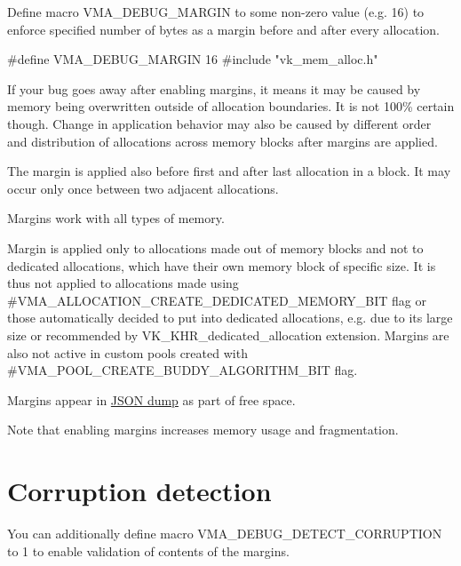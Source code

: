 Define macro {\ttfamily V\+M\+A\+\_\+\+D\+E\+B\+U\+G\+\_\+\+M\+A\+R\+G\+IN} to some non-\/zero value (e.\+g. 16) to enforce specified number of bytes as a margin before and after every allocation.


\begin{DoxyCode}
\textcolor{preprocessor}{#define VMA\_DEBUG\_MARGIN 16}
\textcolor{preprocessor}{#include "vk\_mem\_alloc.h"}
\end{DoxyCode}




If your bug goes away after enabling margins, it means it may be caused by memory being overwritten outside of allocation boundaries. It is not 100\% certain though. Change in application behavior may also be caused by different order and distribution of allocations across memory blocks after margins are applied.

The margin is applied also before first and after last allocation in a block. It may occur only once between two adjacent allocations.

Margins work with all types of memory.

Margin is applied only to allocations made out of memory blocks and not to dedicated allocations, which have their own memory block of specific size. It is thus not applied to allocations made using \#\+V\+M\+A\+\_\+\+A\+L\+L\+O\+C\+A\+T\+I\+O\+N\+\_\+\+C\+R\+E\+A\+T\+E\+\_\+\+D\+E\+D\+I\+C\+A\+T\+E\+D\+\_\+\+M\+E\+M\+O\+R\+Y\+\_\+\+B\+IT flag or those automatically decided to put into dedicated allocations, e.\+g. due to its large size or recommended by V\+K\+\_\+\+K\+H\+R\+\_\+dedicated\+\_\+allocation extension. Margins are also not active in custom pools created with \#\+V\+M\+A\+\_\+\+P\+O\+O\+L\+\_\+\+C\+R\+E\+A\+T\+E\+\_\+\+B\+U\+D\+D\+Y\+\_\+\+A\+L\+G\+O\+R\+I\+T\+H\+M\+\_\+\+B\+IT flag.

Margins appear in \hyperlink{statistics_statistics_json_dump}{J\+S\+ON dump} as part of free space.

Note that enabling margins increases memory usage and fragmentation.\hypertarget{debugging_memory_usage_debugging_memory_usage_corruption_detection}{}\section{Corruption detection}\label{debugging_memory_usage_debugging_memory_usage_corruption_detection}
You can additionally define macro {\ttfamily V\+M\+A\+\_\+\+D\+E\+B\+U\+G\+\_\+\+D\+E\+T\+E\+C\+T\+\_\+\+C\+O\+R\+R\+U\+P\+T\+I\+ON} to 1 to enable validation of contents of the margins.


